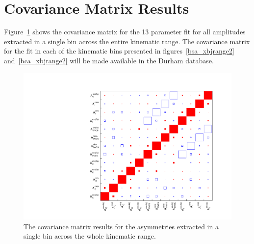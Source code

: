 \documentclass[11pt,a4paper]{article}
\begin{document}
\section{Covariance Matrix Results}
Figure~\ref{pic:covmat} shows the covariance matrix for the 13 parameter fit for all amplitudes extracted in a single bin across the entire kinematic range. The covariance matrix for the fit in each of the kinematic bins presented in figures~\ref{bsa_xbjrange2} and~\ref{bca_xbjrange2} will be made available in the Durham database.
\begin{figure}[tbh]
\centering
\includegraphics[width=\textwidth]{CovMat.pdf}
\caption{The covariance matrix results for the asymmetries extracted in a single bin across the whole kinematic range.}
\label{pic:covmat}
\end{figure}
\end{document}
